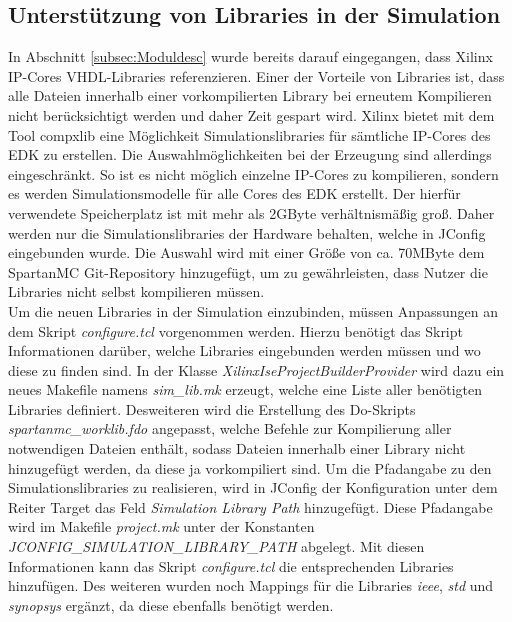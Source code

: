 \subsection{Unterstützung von Libraries in der Simulation}
In Abschnitt \ref{subsec:Moduldesc} wurde bereits darauf eingegangen, dass Xilinx IP-Cores VHDL-Libraries referenzieren. Einer der Vorteile von Libraries ist, dass alle Dateien innerhalb einer vorkompilierten Library bei erneutem Kompilieren nicht berücksichtigt werden und daher Zeit gespart wird. Xilinx bietet mit dem Tool compxlib eine Möglichkeit Simulationslibraries für sämtliche IP-Cores des EDK zu erstellen. Die Auswahlmöglichkeiten bei der Erzeugung sind allerdings eingeschränkt. So ist es nicht möglich einzelne IP-Cores zu kompilieren, sondern es werden Simulationsmodelle für alle Cores des EDK erstellt. Der hierfür verwendete Speicherplatz ist mit mehr als 2GByte verhältnismäßig groß. Daher werden nur die Simulationslibraries der Hardware behalten, welche in JConfig eingebunden wurde. Die Auswahl wird mit einer Größe von ca. 70MByte dem SpartanMC Git-Repository hinzugefügt, um zu gewährleisten, dass Nutzer die Libraries nicht selbst kompilieren müssen.\\
Um die neuen Libraries in der Simulation einzubinden, müssen Anpassungen an dem Skript \textit{configure.tcl} vorgenommen werden. Hierzu benötigt das Skript Informationen darüber, welche Libraries eingebunden werden müssen und wo diese zu finden sind. In der Klasse \textit{XilinxIseProjectBuilderProvider} wird dazu ein neues Makefile namens \textit{sim\_lib.mk} erzeugt, welche eine Liste aller benötigten Libraries definiert. Desweiteren wird die Erstellung des Do-Skripts \textit{spartanmc\_worklib.fdo} angepasst, welche Befehle zur Kompilierung aller notwendigen Dateien enthält, sodass Dateien innerhalb einer Library nicht hinzugefügt werden, da diese ja vorkompiliert sind. Um die Pfadangabe zu den Simulationslibraries zu realisieren, wird in JConfig der Konfiguration unter dem Reiter Target das Feld \textit{Simulation Library Path} hinzugefügt. Diese Pfadangabe wird im Makefile \textit{project.mk} unter der Konstanten \textit{JCONFIG\_SIMULATION\_LIBRARY\_PATH} abgelegt. Mit diesen Informationen kann das Skript \textit{configure.tcl} die entsprechenden Libraries hinzufügen. Des weiteren wurden noch Mappings für die Libraries \textit{ieee}, \textit{std} und \textit{synopsys} ergänzt, da diese ebenfalls benötigt werden.
